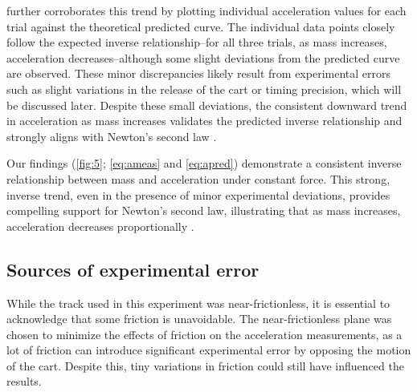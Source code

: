 ﻿\documentclass[reprint,amsmath,amssymb,aps]{revtex4-2}
\begin{document}
 further corroborates this trend by plotting individual acceleration values for each trial against the theoretical predicted curve. The individual data points closely follow the expected inverse relationship–for all three trials, as mass increases, acceleration decreases–although some slight deviations from the predicted curve are observed. These minor discrepancies likely result from experimental errors such as slight variations in the release of the cart or timing precision, which will be discussed later. Despite these small deviations, the consistent downward trend in acceleration as mass increases validates the predicted inverse relationship and strongly aligns with Newton’s second law \cite{knight2017physics}.


Our findings (\cref{fig:5}; \cref{eq:ameas} and \cref{eq:apred}) demonstrate a consistent inverse relationship between mass and acceleration under constant force. This strong, inverse trend, even in the presence of minor experimental deviations, provides compelling support for Newton’s second law, illustrating that as mass increases, acceleration decreases proportionally \cite{knight2017physics}. %

\subsection{Sources of experimental error}
While the track used in this experiment was near-frictionless, it is essential to acknowledge that some friction is unavoidable. The near-frictionless plane was chosen to minimize the effects of friction on the acceleration measurements, as a lot of friction can introduce significant experimental error by opposing the motion of the cart. Despite this, tiny variations in friction could still have influenced the results.
\end{document}

